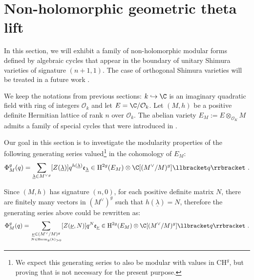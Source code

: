\documentclass[11pt,letterpaper,english]{amsart}
\numberwithin{equation}{subsection}
\numberwithin{equation}{section}
\newcommand\cO{{\mathcal O}}
\theoremstyle{plain}
\theoremstyle{remark}
\begin{document}





\section{Non-holomorphic geometric theta lift}\label{s:theta-lift}

In this section, we will exhibit a family of non-holomorphic modular forms defined by algebraic cycles that appear in the boundary of unitary Shimura varieties of signature $(n+1,1)$. The case of orthogonal Shimura varieties will be treated in a future work \cite{engel-greer-tayou-2}.

\medskip 


We keep the notations from previous sections: $k\hookrightarrow \C$ is an imaginary quadratic field with ring of integers $\mathcal{O}_k$ and let $E=\C/\mathcal{O}_k$. Let $(M,h)$ be a positive definite Hermitian lattice of rank $n$ over $\mathcal{O}_k$. The abelian variety $E_M:=E\otimes_{\cO_K}M$ admits a family of special cycles that were introduced in . 


\medskip 


Our goal in this section is to investigate the modularity properties of the following generating series valued\footnote{We expect this generating series to also be modular with values in $\mathrm{CH}^g$, but proving that is not necessary for the present purpose.} in the cohomology of $E_M$: 
\[\Phi_M^g(q)=\sum_{\underline{\lambda}\in {M^\vee}^g}[Z(\underline \lambda)]q^{h(\underline{\lambda})}\mathfrak e_{\underline \lambda}\in \mathrm{H}^{2g}(E_M)\otimes \C[(M^\vee/M)^g]\llbracket q \rrbracket~.\]

Since $(M,h)$ has signature $(n,0)$, for each positive definite matrix $N$, there are finitely many vectors in $(M^\vee)^g$ such that $h(\underline \lambda)=N$, therefore the generating series above could be rewritten as: 
\[\Phi^g_M(q)=\sum_{\underset{N\in \mathrm{Herm}_{g}(k)_{>0}}{\underline{\nu} \in (M^\vee/M)^g}}[Z(\underline{\nu},N)]q^{N}\mathfrak e_{\underline\nu}\in \mathrm{H}^{2g}(E_M)\otimes \C[(M^\vee/M)^g]\llbracket q \rrbracket~.\]
\end{document}
